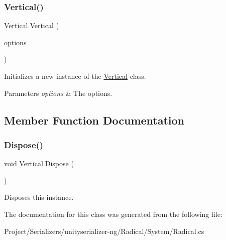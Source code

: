 \subsubsection{\texorpdfstring{Vertical()}{Vertical()}}
{\footnotesize\ttfamily Vertical.\+Vertical (\begin{DoxyParamCaption}\item[{params G\+U\+I\+Layout\+Option \mbox{[}$\,$\mbox{]}}]{options }\end{DoxyParamCaption})\hspace{0.3cm}{\ttfamily [inline]}}



Initializes a new instance of the \hyperlink{class_vertical}{Vertical} class. 


\begin{DoxyParams}{Parameters}
{\em options} & The options.\\
\hline
\end{DoxyParams}


\subsection{Member Function Documentation}
\mbox{\label{class_vertical_a3329b58e37483e88511f34f2fe7eea72}} 
\subsubsection{\texorpdfstring{Dispose()}{Dispose()}}
{\footnotesize\ttfamily void Vertical.\+Dispose (\begin{DoxyParamCaption}{ }\end{DoxyParamCaption})\hspace{0.3cm}{\ttfamily [inline]}}



Disposes this instance. 



The documentation for this class was generated from the following file\+:\begin{DoxyCompactItemize}
\item 
Project/\+Serializers/unityserializer-\/ng/\+Radical/\+System/Radical.\+cs\end{DoxyCompactItemize}
